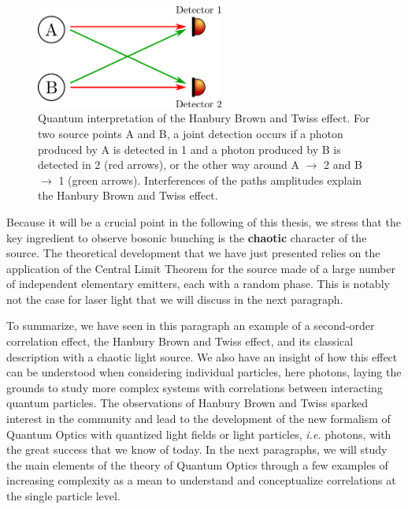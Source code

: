 \begin{figure}
    \centering
    \includegraphics[width=0.55\textwidth]{Fig/Chapter1/HBT_scheme.png}
    \caption[Quantum interpretation of the Hanbury Brown and Twiss effect]{Quantum interpretation of the Hanbury Brown and Twiss effect. For two source points A and B, a joint detection occurs if a photon produced by A is detected in 1 and a photon produced by B is detected in 2 (red arrows), or the other way around A $\rightarrow$ 2 and B $\rightarrow$ 1 (green arrows). Interferences of the paths amplitudes explain the Hanbury Brown and Twiss effect.}
    \label{fig:HBT_scheme}
\end{figure}

Because it will be a crucial point in the following of this thesis, we stress that the key ingredient to observe bosonic bunching is the \textbf{chaotic} character of the source. The theoretical development that we have just presented relies on the application of the Central Limit Theorem for the source made of a large number of independent elementary emitters, each with a random phase. This is notably not the case for laser light that we will discuss in the next paragraph.


To summarize, we have seen in this paragraph an example of a second-order correlation effect, the Hanbury Brown and Twiss effect, and its classical description with a chaotic light source. We also have an insight of how this effect can be understood when considering individual particles, here photons, laying the grounds to study more complex systems with correlations between interacting quantum particles. The observations of Hanbury Brown and Twiss sparked interest in the community and lead to the development of the new formalism of Quantum Optics \cite{glauber1963quantum} with quantized light fields or light particles, {\it i.e.} photons, with the great success that we know of today. In the next paragraphs, we will study the main elements of the theory of Quantum Optics through a few examples of increasing complexity as a mean to understand and conceptualize correlations at the single particle level.


